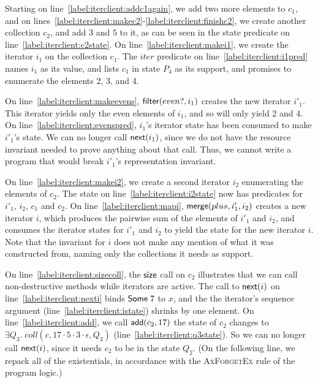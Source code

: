 Starting on line~\ref{label:iterclient:addc1again}, we add two more
elements to $c_1$, and on
lines~\ref{label:iterclient:makec2}-\ref{label:iterclient:finishc2},
we create another collection $c_2$, and add $3$ and $5$ to it, as can
be seen in the state predicate on
line~\ref{label:iterclient:c2state}. On
line~\ref{label:iterclient:makei1}, we create the iterator $i_1$ on
the collection $c_1$. The $iter$ predicate on
line~\ref{label:iterclient:i1pred} names $i_1$ as its value, and lists
$c_1$ in state $P_4$ as its support, and promises to enumerate the
elements 2, 3, and 4.

On line~\ref{label:iterclient:makeevens}, $\mathsf{filter}(even?, i_1)$
creates the new iterator $i'_1$. This iterator yields only the even
elements of $i_1$, and so will only yield 2 and 4. On
line~\ref{label:iterclient:evenspred}, $i_1$'s iterator state has been
consumed to make $i'_1$'s state. We can no longer call
$\mathsf{next}(i_1)$, since we do not have the resource invariant needed
to prove anything about that call. Thus, we cannot write a program
that would break $i'_1$'s representation invariant.

On line~\ref{label:iterclient:makei2}, we create a second iterator
$i_2$ enumerating the elements of $c_2$. The state on line~\ref{label:iterclient:i2state} now has
predicates for $i'_1$, $i_2$, $c_1$ and $c_2$. On line~\ref{label:iterclient:mapi},
$\mathsf{merge}(plus, i'_1, i_2)$ creates a new iterator $i$, which
produces the pairwise sum of the elements of $i'_1$ and $i_2$, and
consumes the iterator states for $i'_1$ and $i_2$ to yield the state
for the new iterator $i$. Note that the invariant for $i$ does not
make any mention of what it was constructed from, naming only the
collections it needs as support.

On line~\ref{label:iterclient:sizecoll}, the $\mathsf{size}$ call on $c_2$
illustrates that we can call non-destructive methods while iterators
are active. The call to $\mathsf{next}(i)$ on
line~\ref{label:iterclient:nexti} binds $\mathsf{Some\; }7$ to $x$, and
the the iterator's sequence argument
(line~\ref{label:iterclient:istate}) shrinks by one element. On
line~\ref{label:iterclient:add}, we call $\mathsf{add}(c_2, 17)$ the state
of $c_2$ changes to $\exists Q_3.\; coll(c, 17\cdot 5 \cdot
3\cdot\epsilon, Q_3)$ (line~\ref{label:iterclient:q3state}). So we can
no longer call $\mathsf{next}(i)$, since it needs $c_2$ to be in the state
$Q_2$. (On the following line, we repack all of the existentials, in
accordance with the \textsc{AxForgetEx} rule of the program logic.)

